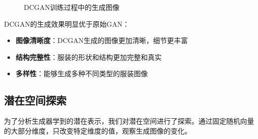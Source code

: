 \documentclass[UTF8]{ctexart}
\begin{document}
\begin{figure}[H]
\centering
{}
\caption{DCGAN训练过程中的生成图像}
\label{fig:dcgan_progression}
\end{figure}

DCGAN的生成效果明显优于原始GAN：
\begin{itemize}
\item \textbf{图像清晰度}：DCGAN生成的图像更加清晰，细节更丰富
\item \textbf{结构完整性}：服装的形状和结构更加完整和真实
\item \textbf{多样性}：能够生成多种不同类型的服装图像
\end{itemize}

\subsection{潜在空间探索}

为了分析生成器学到的潜在表示，我们对潜在空间进行了探索。通过固定随机向量的大部分维度，只改变特定维度的值，观察生成图像的变化。
\end{document}
